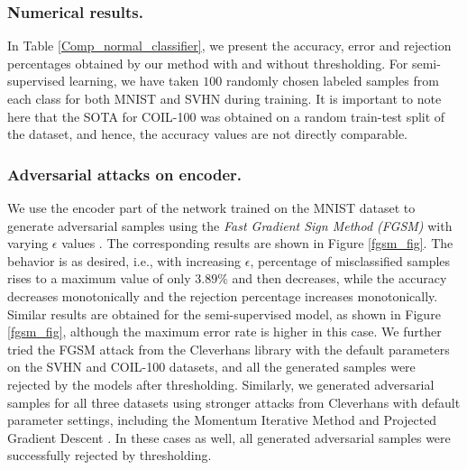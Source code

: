 \documentclass[letterpaper]{article} %
\begin{document}
\subsubsection{Numerical results.}
In Table \ref{Comp_normal_classifier}, we present the accuracy, error and rejection percentages obtained by our method with and without thresholding. For semi-supervised learning, we have taken $100$ randomly chosen labeled samples from each class for both MNIST and SVHN during training. 
It is important to note here that the SOTA for COIL-100 was obtained on a random train-test split of the dataset, and hence, the accuracy values are not directly comparable.

\subsubsection{Adversarial attacks on encoder.}
We use the encoder part of the network trained on the MNIST dataset to generate adversarial samples using the \textit{Fast Gradient Sign Method (FGSM)} with varying $\epsilon$ values . The corresponding results are shown in Figure \ref{fgsm_fig}. The behavior is as desired, i.e., with increasing $\epsilon$, percentage of misclassified samples rises to a maximum value of only $3.89\%$ and then decreases, while the accuracy decreases monotonically and the rejection percentage increases monotonically. Similar results are obtained for the semi-supervised model, as shown in Figure \ref{fgsm_fig}, although the maximum error rate is higher in this case. We further tried the FGSM attack from the Cleverhans library  with the default parameters on the SVHN and COIL-100 datasets, and all the generated samples were rejected by the models after thresholding. Similarly, we generated adversarial samples for all three datasets using stronger attacks from Cleverhans with default parameter settings, including the Momentum Iterative Method  and Projected Gradient Descent . In these cases as well, all generated adversarial samples were successfully rejected by thresholding.
\end{document}
